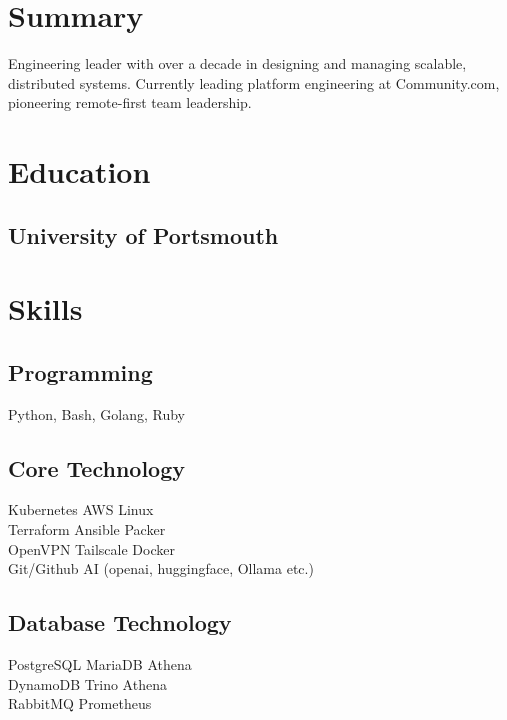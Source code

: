 \documentclass[]{resume}
\begin{document}
\hfill
\begin{minipage}[t]{0.33\textwidth}


\section{Summary}
Engineering leader with over a decade in designing and managing scalable, distributed systems. Currently leading platform engineering at Community.com, pioneering remote-first team leadership.
\sectionsep


\section{Education}

\subsection{University of Portsmouth}
\sectionsep


\section{Skills}
\subsection{Programming}
Python, Bash, Golang, Ruby
\sectionsep

\subsection{Core Technology}
Kubernetes \textbullet{} AWS \textbullet{} Linux \\
Terraform \textbullet{} Ansible \textbullet{} Packer \\
OpenVPN \textbullet{} Tailscale \textbullet{} Docker \\
Git/Github \textbullet{} AI (openai, huggingface, Ollama etc.) \\
\sectionsep

\subsection{Database Technology}
PostgreSQL \textbullet{} MariaDB \textbullet{} Athena \\
DynamoDB \textbullet{} Trino \textbullet{} Athena \\ 
RabbitMQ \textbullet{} Prometheus \\
\sectionsep


\end{minipage}
\end{document}
